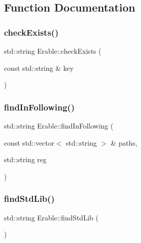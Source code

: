 \subsection{Function Documentation}
\mbox{\label{namespace_erable_a9ac51d513b3b6629dcde72f4bf50dce2}} 
\subsubsection{\texorpdfstring{checkExists()}{checkExists()}}
{\footnotesize\ttfamily std\+::string Erable\+::check\+Exists (\begin{DoxyParamCaption}\item[{const std\+::string \&}]{key }\end{DoxyParamCaption})}

\mbox{\label{namespace_erable_afa01b2a2d08571557c8442da41cb72ec}} 
\subsubsection{\texorpdfstring{findInFollowing()}{findInFollowing()}}
{\footnotesize\ttfamily std\+::string Erable\+::find\+In\+Following (\begin{DoxyParamCaption}\item[{const std\+::vector$<$ std\+::string $>$ \&}]{paths,  }\item[{std\+::string}]{reg }\end{DoxyParamCaption})}

\mbox{\label{namespace_erable_a88ace7b6867a84bf35b98b063516dd06}} 
\subsubsection{\texorpdfstring{findStdLib()}{findStdLib()}}
{\footnotesize\ttfamily std\+::string Erable\+::find\+Std\+Lib (\begin{DoxyParamCaption}{ }\end{DoxyParamCaption})}

\mbox{\label{namespace_erable_a55a887a018ba68ab971e3711a638dfa1}} 
